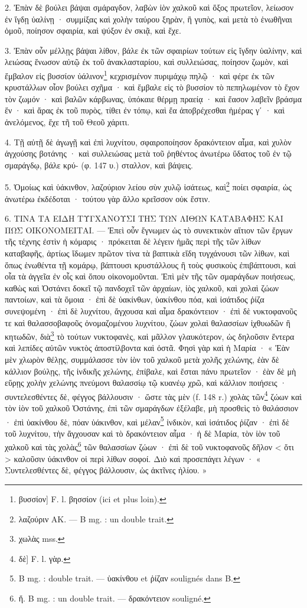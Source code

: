 \documentclass[a4paper, 11pt, oneside, polutonikogreek, french]{article}
\begin{document}
2. Ἐπὰν δὲ βούλει βάψαι σμάραγδον, λαβὼν ἰὸν χαλκοῦ καὶ ὄξος πρωτεῖον, λείωσον ἐν ἴγδῃ ὑαλίνῃ · συμμίξας καὶ χολὴν ταύρου ξηρὰν, ἢ γυπὸς, καὶ μετὰ τὸ ἑνωθῆναι ὁμοῦ, ποίησον σφαιρία, καὶ ψύξον ἐν σκιᾷ, καὶ ἔχε.

3. Ἐπὰν οὖν μέλλῃς βάψαι λίθον, βάλε ἐκ τῶν σφαιρίων τούτων εἰς ἴγδην ὑαλίνην, καὶ λειώσας ἕνωσον αὐτῷ ἐκ τοῦ ἀνακλασταρίου, καὶ συλλειώσας, ποίησον ζωμὸν, καὶ ἔμβαλον εἰς βυσσίον ὑάλινον\footnote{βυσσίον] F. l. βησσίον (ici et plus loin).} κεχρισμένον πυριμάχῳ πηλῷ · καὶ φέρε ἐκ τῶν κρυστάλλων οἷον βούλει σχῆμα · καὶ ἔμβαλε εἰς τὸ βυσσίον τὸ πεπηλωμένον τὸ ἔχον τὸν ζωμόν · καὶ βαλῶν κάρβωνας, ὑπόκαιε θέρμῃ πραείᾳ · καὶ ἔασον λαβεῖν βράσμα ἕν · καὶ ἄρας ἐκ τοῦ πυρὸς, τίθει ἐν τόπῳ, καὶ ἔα ἀποβρέχεσθαι ἡμέρας γʹ · καὶ ἀνελόμενος, ἔχε τῆ τοῦ Θεοῦ χάριτι.

4. Τῇ αὐτῇ δὲ ἀγωγῇ καὶ ἐπὶ λυχνίτου, σφαιροποίησον δρακόντειον αἷμα, καὶ χυλὸν ἀγχούσης βοτάνης · καὶ συλλειώσας μετὰ τοῦ ῥηθέντος ἀνωτέρω ὕδατος τοῦ ἐν τῷ σμαράγδῳ, βάλε κρύ- (φ. 147 υ.) σταλλον, καὶ βάψεις.

5. Ὁμοίως καὶ ὑάκινθον, λαζούριον λείου σὺν χυλῷ ἰσάτεως, καὶ\footnote{λαζούριν AK. --- B mg. : un double trait.} ποίει σφαιρία, ὡς ἀνωτέρω ἐκδέδοται · τούτου γὰρ ἄλλο κρεῖσσον οὐκ ἔστιν.

6. ΤΙΝΑ ΤΑ ΕΙΔΗ ΤΥΓΧΑΝΟΥΣΙ ΤΗΣ ΤΩΝ ΛΙΘΩΝ ΚΑΤΑΒΑΦΗΣ ΚΑΙ ΠΩΣ ΟΙΚΟΝΟΜΕΙΤΑΙ. --- Ἐπεὶ οὖν ἔγνωμεν ὡς τὸ συνεκτικὸν αἴτιον τῶν ἔργων τῆς τέχνης ἐστὶν ἡ κόμαρις · πρόκειται δὲ λέγειν ἡμᾶς περὶ τῆς τῶν λίθων καταβαφῆς, ἀρτίως ἴδωμεν πρῶτον τίνα τὰ βαπτικὰ εἴδη τυγχάνουσι τῶν λίθων, καὶ ὅπως ἑνωθέντα τῇ κομάρῳ, βάπτουσι κρυστάλλους ἢ τοὺς φυσικοὺς ἐπιβάπτουσι, καὶ οἷα τὰ ἀγγεῖα ἐν οἷς καὶ ὅπου οἰκονομοῦνται. Ἐπὶ μὲν τῆς τῶν σμαράγδων ποιήσεως, καθὼς καὶ Ὀστάνει δοκεῖ τῷ πανδοχεῖ τῶν ἀρχαίων, ἰὸς χαλκοῦ, καὶ χολαὶ ζώων παντοίων, καὶ τὰ ὅμοια · ἐπὶ δὲ ὑακίνθων, ὑακίνθου πόα, καὶ ἰσάτιδος ῥίζα συνεψομένη · ἐπὶ δὲ λυχνίτου, ἄγχουσα καὶ αἷμα δρακόντειον · ἐπὶ δὲ νυκτοφανοῦς τε καὶ θαλασσοβαφοῦς ὀνομαζομένου λυχνίτου, ζώων χολαὶ θαλασσίων ἰχθυωδῶν ἢ κητωδῶν, διὰ\footnote{χωλὰς mss.} τὸ τούτων νυκτοφανὲς, καὶ μᾶλλον γλαυκότερον, ὡς δηλοῦσιν ἔντερα καὶ λεπίδες αὐτῶν νυκτὸς ἀποστίλβοντα καὶ ὀστᾶ. Φησὶ γὰρ καὶ ἡ Μαρία · « Ἐὰν μὲν χλωρὸν θέλῃς, συμμάλασσε τὸν ἰὸν τοῦ χαλκοῦ μετὰ χολῆς χελώνης, ἐὰν δὲ κάλλιον βούλῃς, τῆς ἰνδικῆς χελώνης, ἐπίβαλε, καὶ ἔσται πάνυ πρωτεῖον · ἐὰν δὲ μὴ εὕρῃς χολὴν χελώνης πνεύμονι θαλασσίῳ τῷ κυανέῳ χρῶ, καὶ κάλλιον ποιήσεις · συντελεσθέντες δὲ, φέγγος βάλλουσιν · ὥστε τὰς μὲν (f. 148 r.) χολὰς τῶν\footnote{δὲ] F. l. γὰρ.} ζώων καὶ τὸν ἰὸν τοῦ χαλκοῦ Ὀστάνης, ἐπὶ τῶν σμαράγδων ἐξέλαβε, μὴ προσθεὶς τὸ θαλάσσιον · ἐπὶ ὑακίνθου δὲ, πόαν ὑάκινθον, καὶ μέλαν\footnote{B mg. : double trait. --- ὑακίνθου et ῥίζαν soulignés dans B.} ἰνδικὸν, καὶ ἰσάτιδος ῥίζαν · ἐπὶ δὲ τοῦ λυχνίτου, τὴν ἄγχουσαν καὶ τὸ δρακόντειον αἷμα · ἡ δὲ Μαρία, τὸν ἰὸν τοῦ χαλκοῦ καὶ τὰς χολὰς\footnote{ἤ. B mg. : un double trait. --- δρακόντειον souligné.} τῶν θαλασσίων ζώων · ἐπὶ δὲ τοῦ νυκτοφανοῦς δῆλον < ὅτι > καλοῦσιν ὑάκινθον οἱ περὶ λίθων σοφοί. Διὸ καὶ προσεπάγει λέγων · « Συντελεσθέντες δὲ, φέγγος βάλλουσιν, ὡς ἀκτῖνες ἡλίου. »
\end{document}
